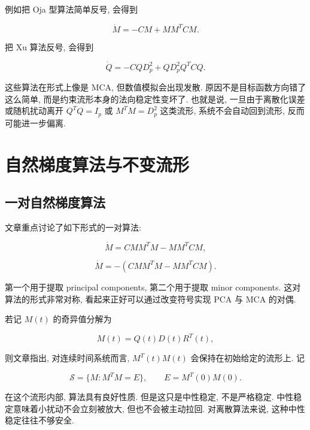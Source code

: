 \documentclass[oneside]{ctexart}
\begin{document}
例如把 Oja 型算法简单反号, 会得到

\begin{equation}
    \dot{M}=-CM+MM^TCM.
\end{equation}

把 Xu 算法反号, 会得到

\begin{equation}
    \dot{Q}=-CQD_p^2+QD_p^2Q^TCQ.
\end{equation}

这些算法在形式上像是 MCA, 但数值模拟会出现发散. 原因不是目标函数方向错了这么简单, 而是约束流形本身的法向稳定性变坏了. 也就是说, 一旦由于离散化误差或随机扰动离开 $Q^TQ=I_p$ 或 $M^TM=D_p^2$ 这类流形, 系统不会自动回到流形, 反而可能进一步偏离.

\section{自然梯度算法与不变流形}

\subsection{一对自然梯度算法}

文章重点讨论了如下形式的一对算法:

\begin{equation}
    \dot{M}=CMM^TM-MM^TCM,
\end{equation}

\begin{equation}
    \dot{M}=-(CMM^TM-MM^TCM).
\end{equation}

第一个用于提取 principal components, 第二个用于提取 minor components. 这对算法的形式非常对称, 看起来正好可以通过改变符号实现 PCA 与 MCA 的对偶.

若记 $M(t)$ 的奇异值分解为

\begin{equation}
    M(t)=Q(t)D(t)R^T(t),
\end{equation}

则文章指出, 对连续时间系统而言, $M^T(t)M(t)$ 会保持在初始给定的流形上. 记

\begin{equation}
    \mathcal{S}=\{M:M^TM=E\},
    \qquad E=M^T(0)M(0).
\end{equation}

在这个流形内部, 算法具有良好性质. 但是这只是中性稳定, 不是严格稳定. 中性稳定意味着小扰动不会立刻被放大, 但也不会被主动拉回. 对离散算法来说, 这种中性稳定往往不够安全.
\end{document}

